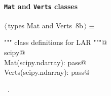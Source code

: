 \documentclass[11pt,oneside]{article}	%
\begin{document}
\paragraph{\texttt{Mat} and \texttt{Verts} classes}
\begin{flushleft} \small \label{scrap22}
\protect{}$\langle\,$types Mat and Verts\nobreak\ {\footnotesize 8b}$\,\rangle\equiv$
\vspace{-1ex}
\begin{list}{}{} \item
\mbox{}\verb@""" class definitions for LAR """@\\
\mbox{}\verb@import scipy@\\
\mbox{}\verb@class Mat(scipy.ndarray): pass@\\
\mbox{}\verb@class Verts(scipy.ndarray): pass@\\
\mbox{}\verb@@{\NWsep}
\end{list}
\vspace{-1ex}
\footnotesize\addtolength{\baselineskip}{-1ex}
\begin{list}{}{\setlength{\itemsep}{-\parsep}\setlength{\itemindent}{-\leftmargin}}
\item \NWtxtMacroRefIn\ .
\end{list}
\end{flushleft}
\end{document}
